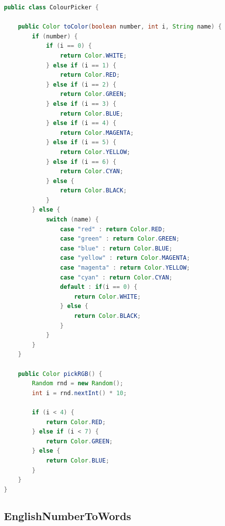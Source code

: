 \begin{lstlisting}[language=Java, caption=ColourPicker]
public class ColourPicker {

    public Color toColor(boolean number, int i, String name) {
        if (number) {
            if (i == 0) {
                return Color.WHITE;
            } else if (i == 1) {
                return Color.RED;
            } else if (i == 2) {
                return Color.GREEN;
            } else if (i == 3) {
                return Color.BLUE;
            } else if (i == 4) {
                return Color.MAGENTA;
            } else if (i == 5) {
                return Color.YELLOW;
            } else if (i == 6) {
                return Color.CYAN;
            } else {
                return Color.BLACK;
            }
        } else {
            switch (name) {
                case "red" : return Color.RED;
                case "green" : return Color.GREEN;
                case "blue" : return Color.BLUE;
                case "yellow" : return Color.MAGENTA;
                case "magenta" : return Color.YELLOW;
                case "cyan" : return Color.CYAN;
                default : if(i == 0) {
                    return Color.WHITE;
                } else {
                    return Color.BLACK;
                }
            }
        }
    }

    public Color pickRGB() {
        Random rnd = new Random();
        int i = rnd.nextInt() * 10;

        if (i < 4) {
            return Color.RED;
        } else if (i < 7) {
            return Color.GREEN;
        } else {
            return Color.BLUE;
        }
    }
}
\end{lstlisting}

\subsection{EnglishNumberToWords}

